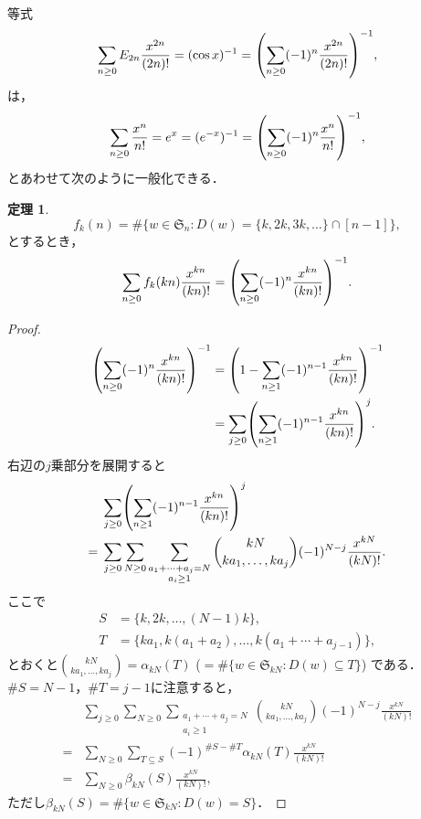 \documentclass[xelatex,ja=standard,a4paper,14pt,everyparhook=compat]{bxjsarticle}
\newcommand{\fS}{\mathfrak{S}}
\newcommand{\paren}[1]{\mleft(#1\mright)}
\theoremstyle{definition}
\newtheorem*{theorem*}{定理}
\begin{document}
等式 \begin{equation*}
    \sum_{n \geq 0} E_{2n} \frac{x^{2n}}{(2n)!} = (\cos x)^{-1}
    = \paren{\sum_{n \geq 0} (-1)^n \frac{x^{2n}}{(2n)!}}^{-1},
\end{equation*}
は， \begin{equation*}
    \sum_{n \geq 0} \frac{x^n}{n!} = e^x = (e^{-x})^{-1} = \paren{\sum_{n \geq 0} (-1)^n \frac{x^n}{n!}}^{-1},
\end{equation*}
とあわせて次のように一般化できる．

\begin{theorem*}
    \begin{equation*}
        f_k(n) = \# \{w \in \fS_n : D(w) = \{k, 2k, 3k, \ldots\} \cap [n-1] \},
    \end{equation*}
    とするとき， \begin{equation*}
        \sum_{n \geq 0} f_k(kn) \frac{x^{kn}}{(kn)!}
        = \paren{\sum_{n \geq 0} (-1)^n \frac{x^{kn}}{(kn)!}}^{-1}.
    \end{equation*}
\end{theorem*}
\begin{proof}
    \begin{align*}
        \paren{\sum_{n \geq 0} (-1)^n \frac{x^{kn}}{(kn)!}}^{-1}
        & = \paren{1 - \sum_{n \geq 1} (-1)^{n-1} \frac{x^{kn}}{(kn)!}}^{-1} \\
        & = \sum_{j \geq 0} \paren{\sum_{n \geq 1} (-1)^{n-1} \frac{x^{kn}}{(kn)!}}^j.
    \end{align*}
    右辺の$j$乗部分を展開すると \begin{align*}
            & \sum_{j \geq 0} \paren{\sum_{n \geq 1} (-1)^{n-1} \frac{x^{kn}}{(kn)!}}^j \\
        ={} & \sum_{j \geq 0} \sum_{N \geq 0}
                \sum_{\substack{a_1 + \cdots + a_j = N \\ a_i \geq 1}}
                \binom{kN}{ka_1, \ldots, ka_j} (-1)^{N-j} \frac{x^{kN}}{(kN)!}.
    \end{align*}
    ここで \begin{align*}
        S & = \{k, 2k, \ldots, (N-1)k\}, \\
        T & = \{ka_1, k(a_1+a_2), \ldots, k(a_1+\cdots+a_{j-1})\},
    \end{align*}
    とおくと$\binom{kN}{ka_1, \ldots, ka_j} = \alpha_{kN}(T)$ ($=\#\{w \in \fS_{kN} : D(w) \subseteq T\}$) である．$\#S = N-1$，$\#T = j-1$に注意すると， \begin{align*}
            & \sum_{j \geq 0} \sum_{N \geq 0}
                \sum_{\substack{a_1 + \cdots + a_j = N \\ a_i \geq 1}}
                \binom{kN}{ka_1, \ldots, ka_j} (-1)^{N-j} \frac{x^{kN}}{(kN)!} \\
        ={} & \sum_{N \geq 0} \sum_{T \subseteq S}
                (-1)^{\#S-\#T} \alpha_{kN}(T) \frac{x^{kN}}{(kN)!} \\
        ={} & \sum_{N \geq 0} \beta_{kN}(S) \frac{x^{kN}}{(kN)!},
    \end{align*}
    ただし$\beta_{kN}(S) = \#\{w \in \fS_{kN} : D(w) = S\}$．
\end{proof}
\end{document}
